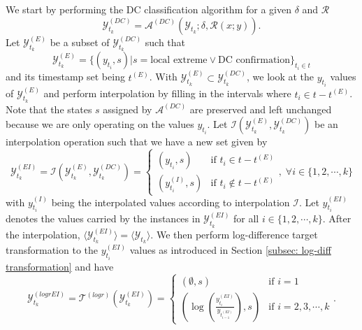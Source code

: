 We start by performing the DC classification algorithm for a given $\delta$ and $\mathcal{R}$
\begin{equation*}
    \mathcal{Y}^{(DC)}_{t_k} = \mathcal{A}^{(DC)} (\mathcal{Y}_{t_k}; \delta, \mathcal{R} (x; y)).
\end{equation*}
Let $\mathcal{Y}^{(E)}_{t_k}$ be a subset of $\mathcal{Y}^{(DC)}_{t_k}$ such that
\begin{equation*}
    \mathcal{Y}^{(E)}_{t_k} = \{(y_{t_i}, s) | s = \text{local extreme} \vee \text{DC confirmation} \}_{t_i \in t}
\end{equation*}
and its timestamp set being $t^{(E)}$. With $\mathcal{Y}^{(E)}_{t_k} \subset \mathcal{Y}^{(DC)}_{t_k}$, we look at the $y_{t_i}$ values of $\mathcal{Y}^{(E)}_{t_k}$ and perform interpolation by filling in the intervals where $t_i \in t - t^{(E)}$. Note that the states $s$ assigned by $\mathcal{A}^{(DC)}$ are preserved and left unchanged because we are only operating on the values $y_{t_i}$. Let $\mathcal{I} (\mathcal{Y}^{(E)}_{t_k}, \mathcal{Y}^{(DC)}_{t_k})$ be an interpolation operation such that we have a new set given by
\begin{equation*}
    \mathcal{Y}^{(EI)}_{t_k} = \mathcal{I} (\mathcal{Y}^{(E)}_{t_k}, \mathcal{Y}^{(DC)}_{t_k}) = \begin{cases}
        (y_{t_i}, s)          &\text{if $t_i \in t - t^{(E)}$} \\
        (y^{(I)}_{t_i}, s)    &\text{if $t_i \notin t - t^{(E)}$}
    \end{cases}, \; \forall i \in \{1, 2, \cdots, k\}
\end{equation*}
with $y^{(I)}_{t_i}$ being the interpolated values according to interpolation $\mathcal{I}$. Let $y^{(EI)}_{t_i}$ denotes the values carried by the instances in $\mathcal{Y}^{(EI)}_{t_k}$ for all $i \in \{ 1, 2, \cdots, k\}$. After the interpolation, $\langle \mathcal{Y}^{(EI)}_{t_k} \rangle = \langle \mathcal{Y}_{t_k} \rangle$.
We then perform log-difference target transformation to the $y^{(EI)}_{t_i}$ values as introduced in Section \ref{subsec: log-diff transformation} and have
\begin{equation*}
    \mathcal{Y}^{(logrEI)}_{t_k} = \mathcal{T}^{(logr)}(\mathcal{Y}^{(EI)}_{t_k}) = \begin{cases}
        (\emptyset, s)  &\text{if $i = 1$} \\
        (\log(\frac{y^{(EI)}_{t_i}}{y_{t^{(EI)}_{i-1}}}), s) &\text{if $i = 2, 3, \cdots, k$}
    \end{cases}.
\end{equation*}
